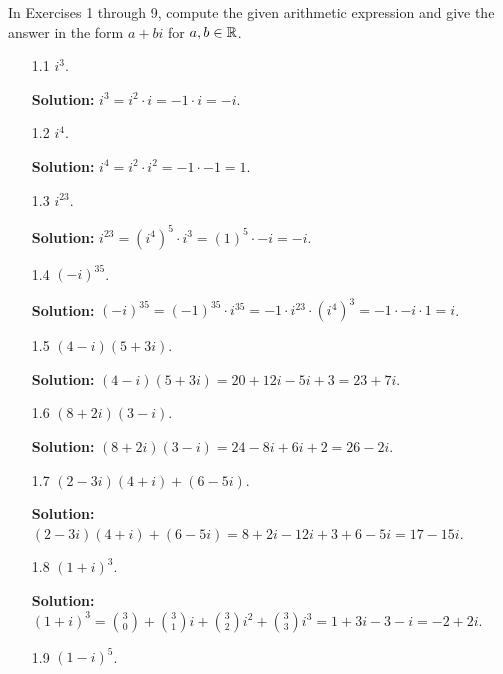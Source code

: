 In Exercises 1 through 9, compute the given arithmetic expression and give the
answer in the form $a + bi$ for $a, b \in \mathbb{R}$.
\begin{enumerate}
   \item[1.1] $i^3$.
   
      \textbf{Solution:} $i^3 = i^2 \cdot i = -1 \cdot i = -i$.
   \item[1.2] $i^4$.
   
      \textbf{Solution:} $i^4 = i^2 \cdot i^2 = -1 \cdot -1 = 1$.
   \item[1.3] $i^{23}$.
   
      \textbf{Solution:} $i^{23} = (i^4)^5 \cdot i^3 = (1)^5 \cdot -i = -i$.
   \item[1.4] $(-i)^{35}$.
   
      \textbf{Solution:} $(-i)^{35} = (-1)^{35} \cdot i^{35} =
      -1 \cdot i^{23} \cdot (i^4)^3 = -1 \cdot -i \cdot 1 = i$.
   \item[1.5] $(4 - i)(5 + 3i)$.
   
      \textbf{Solution:} $(4 - i)(5 + 3i) = 20 + 12i - 5i + 3 = 23 + 7i$.
   \item[1.6] $(8 + 2i)(3 - i)$.
   
      \textbf{Solution:} $(8 + 2i)(3 - i) = 24 - 8i + 6i + 2 = 26 - 2i$.
   \item[1.7] $(2 - 3i)(4 + i) + (6 - 5i)$.
   
      \textbf{Solution:} $(2 - 3i)(4 + i) + (6 - 5i) =
      8 + 2i - 12i + 3 + 6 - 5i = 17 - 15i$.
   \item[1.8] $(1 + i)^3$.
   
      \textbf{Solution:} $\displaystyle(1 + i)^3 = \binom{3}{0} +
      \binom{3}{1} i + \binom{3}{2} i^2 + \binom{3}{3} i^3 = 1 + 3i - 3 - i =
       -2 + 2i$.
   \item[1.9] $(1 - i)^5$.
   

\end{enumerate}
